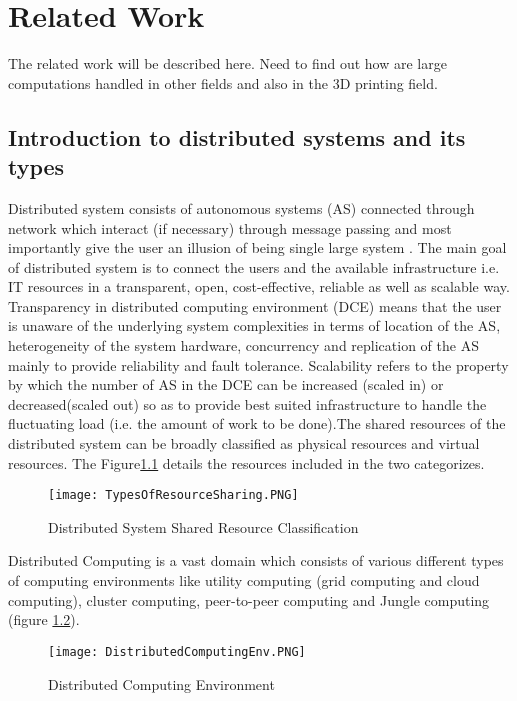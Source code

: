 \chapter{Related Work}
The related work will be described here. Need to find out how are large computations handled in other fields and also in the 3D printing field. 

\section{Introduction to distributed systems and its types}
Distributed system consists of autonomous systems (AS) connected through network which interact (if necessary) through message passing and most importantly give the user an illusion of being single large system \cite{DCE}. The main goal of distributed system is to connect the users and the available infrastructure i.e. IT resources in a transparent, open, cost-effective, reliable as well as scalable way. Transparency in distributed computing environment (DCE) means that the user is unaware of the underlying system complexities in terms of location of the AS, heterogeneity of the system hardware, concurrency and replication of the AS mainly to provide reliability and fault tolerance. Scalability refers to the property by which the number of AS in the DCE can be increased (scaled in) or decreased(scaled out) so as to provide best suited infrastructure to handle the fluctuating load (i.e. the amount of work to be done).The shared resources of the distributed system can be broadly classified as physical resources and virtual resources. The Figure\ref{fig:TypesOfResourceSharing} details the resources included in the two categorizes. 

\begin{figure}[ht!]
\centering
\texttt{[image: TypesOfResourceSharing.PNG]}
\caption{Distributed System Shared Resource Classification}
\label{fig:TypesOfResourceSharing}
\end{figure}
  
Distributed Computing is a vast domain which consists of various different types of computing environments like utility computing (grid computing and cloud computing), cluster computing, peer-to-peer computing and Jungle computing (figure \ref{fig:DistributedComputingEnv}). 

\begin{figure}[ht!]
\centering
\texttt{[image: DistributedComputingEnv.PNG]}
\caption{Distributed Computing Environment}
\label{fig:DistributedComputingEnv}
\end{figure}


